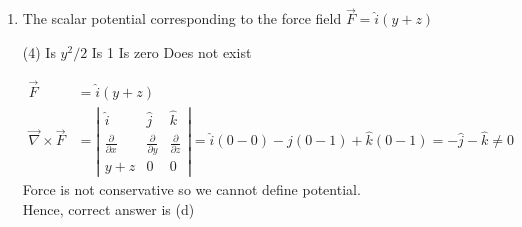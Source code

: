 \begin{enumerate}
\begin{answer}
\begin{align*}
		\vec{L} &=\vec{r} \times \vec{p}=\left(5 \hat{i}-2 t^{2} \hat{j}\right) \times(-8 t \hat{j}) \\
		&=-40 t \hat{k}=-40 \times 2 \hat{k}=-80 \hat{k}
		\end{align*}
			Hence correct answer is (b)
	\end{answer}
	\item The scalar potential corresponding to the force field $\vec{F}=\hat{i}(y+z)$
	 \begin{tasks}(4)
		\task[\textbf{a.}]Is $y^{2} / 2$
		\task[\textbf{b.}] Is 1
		\task[\textbf{c.}]Is zero
		\task[\textbf{d.}] Does not exist
	\end{tasks}
	\begin{answer}
		\begin{align*}
		\vec{F} &=\hat{i}(y+z) \\
	\vec{\nabla} \times \vec{F}&=\left|\begin{array}{ccc}\hat{i} & \hat{j} & \hat{k} \\ \frac{\partial}{\partial x} & \frac{\partial}{\partial y} & \frac{\partial}{\partial z} \\ y+z & 0 & 0\end{array}\right|=\hat{i}(0-0)-\hat{j}(0-1)+\hat{k}(0-1)=-\hat{j}-\hat{k} \neq 0
		\end{align*}
			Force is not conservative so we cannot define potential. \\Hence, correct answer is (d)
	\end{answer}
\end{enumerate}
